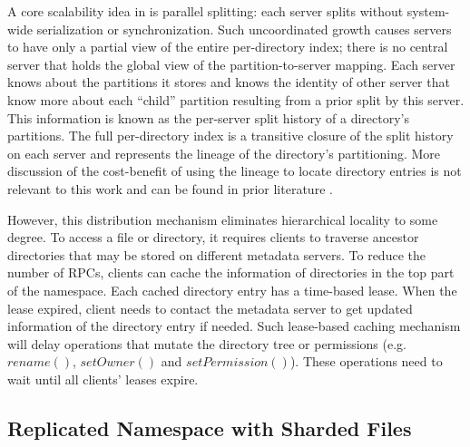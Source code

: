 A core scalability idea in \giga is parallel splitting: each server splits
without system-wide serialization or synchronization.
Such uncoordinated growth causes \giga servers to have only a partial view of
the entire per-directory index;
there is no central server that holds the global view of the
partition-to-server mapping.
Each server knows about the partitions it stores and knows the
identity of other server that know more about each ``child'' partition
resulting from a prior split by this server.
This information is known as the per-server split history of
a directory's partitions.
The full per-directory \giga index is
a transitive closure of the split history on each
server and represents the lineage of the directory's partitioning.
More discussion of the cost-benefit of using
the lineage to locate directory entries is not relevant
to this work and can be found in prior \giga{} literature \cite{GIGA07, GIGA11}.

However, this distribution mechanism eliminates hierarchical locality to
some degree. To access a file or directory, it requires clients to
traverse ancestor directories that may be stored on different metadata servers.
To reduce the number of RPCs, clients can cache the information of
directories in the top part of the namespace.
Each cached directory entry has a time-based lease.
When the lease expired, client needs to contact the metadata server
to get updated information of the directory entry if needed.
Such lease-based caching mechanism will delay operations that
mutate the directory tree or permissions (e.g. $rename()$,
$setOwner()$ and $setPermission()$).
These operations need to wait until all clients' leases expire.

\subsection{Replicated Namespace with Sharded Files}
